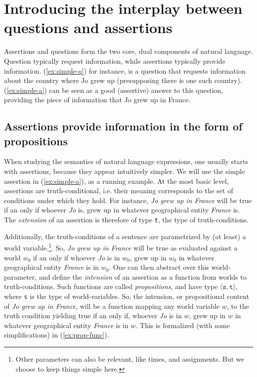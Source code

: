 \chapter{Introducing the interplay between questions and assertions}\label{chap:introduction}


Assertions and questions form the two core, dual components of natural language. Question typically request information, while assertions typically provide information. (\ref{ex:simple-q}) for instance, is a question that requests information about the country where Jo grew up (presupposing there is one such country). (\ref{ex:simple-a}) can be seen as a good (assertive) answer to this question, providing the piece of information that Jo grew up in France.

\begin{exe}
	\ex\label{ex:simple-q-a}
	\begin{xlist}
		\label{ex:simple-q}
		\label{ex:simple-a}
	\end{xlist}
\end{exe}

\section{Assertions provide information in the form of propositions}

When studying the semantics of natural language expressions, one usually starts with assertions, because they appear intuitively simpler. We will use the simple assertion in (\ref{ex:simple-a}), as a running example. At the most basic level, assertions are truth-conditional, i.e. their meaning corresponds to the set of conditions under which they hold. For instance, \textit{Jo grew up in France} will be true if an only if whoever \textit{Jo} is, grew up in whatever geographical entity \textit{France} is. The \textit{extension} of an assertion is therefore of type \texttt{t}, the type of truth-conditions.

Additionally, the truth-conditions of a sentence are parametrized by (at least) a world variable.\footnote{Other parameters can also be relevant, like times, and assignments. But we choose to keep things simple here.}. So, \textit{Jo grew up in France} will be true as evaluated against a world $w_0$ if an only if whoever \textit{Jo} is in $w_0$, grew up in $w_0$ in whatever geographical entity \textit{France} is in $w_0$. One can then abstract over this world-parameter, and define the \textit{intension} of an assertion as a function from worlds to truth-conditions. Such functions are called \textit{propositions}, and have type $\langle \texttt{s}, \texttt{t}\rangle$, where \texttt{s} is the type of world-variables. So, the intension, or propositional content of \textit{Jo grew up in France}, will be a function mapping any world variable $w$, to the truth condition yielding true if an only if, whoever \textit{Jo} is in $w$, grew up in $w$ in whatever geographical entity \textit{France} is in $w$. This is formalized (with some simplifications) in (\ref{ex:prop-func}).

